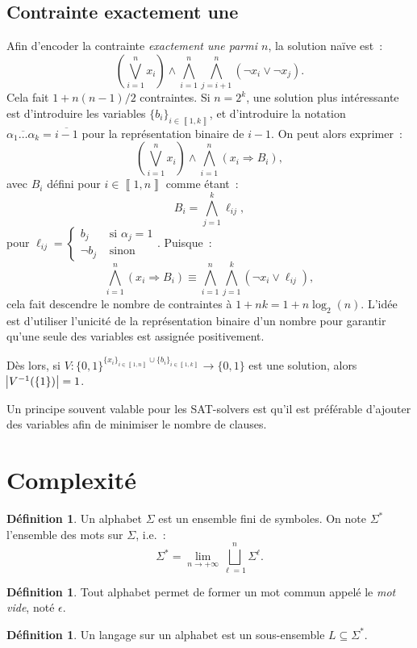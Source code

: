 \documentclass{article}
\theoremstyle{definition}
\newtheorem{déf}[thm]{Définition}
\theoremstyle{remark}
\newcommand{\intint}[2]{\left\llbracket#1, #2\right\rrbracket}
\begin{document}
	\subsection{Contrainte exactement une}
		Afin d'encoder la contrainte \textit{exactement une parmi $n$}, la solution naïve est~:
		\[\left(\bigvee_{i=1}^nx_i\right) \land \bigwedge_{i=1}^n\bigwedge_{j=i+1}^n(\lnot x_i \lor \lnot x_j).\]
		Cela fait $1+n(n-1)/2$ contraintes. Si $n=2^k$, une solution plus intéressante est d'introduire les variables $\{b_i\}_{i \in \intint 1k}$, et d'introduire
		la notation $\overline {\alpha_1\ldots\alpha_k} = \overline {i-1}$ pour la représentation binaire de $i-1$. On peut alors exprimer~:
		\[\left(\bigvee_{i=1}^nx_i\right) \land \bigwedge_{i=1}^n(x_i \Rightarrow B_i),\]
		avec $B_i$ défini pour $i \in \intint 1n$ comme étant~:
		\[B_i = \bigwedge_{j=1}^k\ell_{ij},\]
		pour $\ell_{ij} = \begin{cases}b_j &\text{ si }\alpha_j = 1 \\\lnot b_j&\text{ sinon}\end{cases}$. Puisque~:
		\[\bigwedge_{i=1}^n(x_i \Rightarrow B_i) \equiv \bigwedge_{i=1}^n\bigwedge_{j=1}^k(\lnot x_i \lor \ell_{ij}),\]
		cela fait descendre le nombre de contraintes à $1+nk = 1+n\log_2(n)$. L'idée est d'utiliser l'unicité de la représentation binaire d'un nombre pour garantir
		qu'une seule des variables est assignée positivement.

		Dès lors, si $V : \{0, 1\}^{\{x_i\}_{i \in \intint 1n} \cup \{b_i\}_{i \in \intint 1k}} \to \{0, 1\}$ est une solution, alors $\abs {V^{-1}(\{1\})} = 1$.

		Un principe souvent valable pour les SAT-solvers est qu'il est préférable d'ajouter des variables afin de minimiser le nombre de clauses.

\section{Complexité}
	\begin{déf} Un alphabet $\Sigma$ est un ensemble fini de symboles. On note $\Sigma^*$ l'ensemble des mots sur $\Sigma$, i.e.~:
	\[\Sigma^* = \lim_{n \to +\infty}\bigsqcup_{\ell=1}^n\Sigma^\ell.\]
	\end{déf}

	\begin{déf} Tout alphabet permet de former un mot commun appelé le \textit{mot vide}, noté $\epsilon$.
	\end{déf}

	\begin{déf} Un langage sur un alphabet est un sous-ensemble $L \subseteq \Sigma^*$.
	\end{déf}
\end{document}
